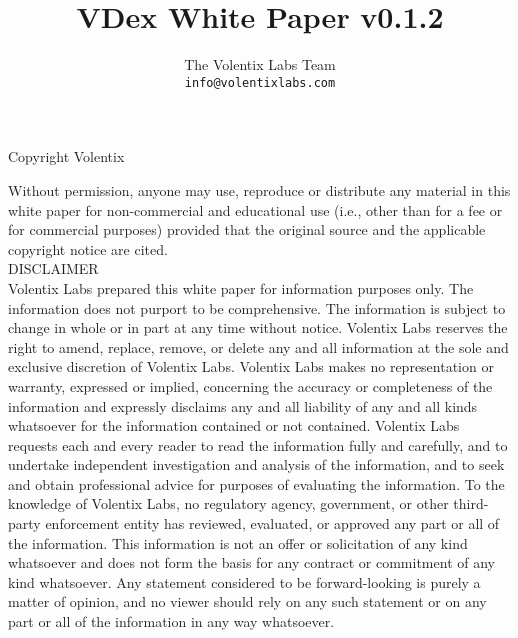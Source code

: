 \documentclass[]{article}
\title{VDex White Paper v0.1.2}
\author{
		The Volentix Labs Team\\
	\texttt{info@volentixlabs.com}
}
\begin{document}
\tableofcontents
\maketitle
\begin{description}
\item Copyright  Volentix
\end{description}

{\tiny Without permission, anyone may use, reproduce or distribute any material in this white paper for non-commercial and educational use (i.e., other than for a fee or for commercial purposes) provided that the original source and the applicable copyright notice are cited.\\

DISCLAIMER \\

Volentix Labs prepared this white paper for information purposes only. The information does not purport to be comprehensive. The information is subject to change in whole or in part at any time without notice. Volentix Labs reserves the right to amend, replace, remove, or delete any and all information at the sole and exclusive discretion of Volentix Labs. Volentix Labs makes no representation or warranty, expressed or implied, concerning the accuracy or completeness of the information and expressly disclaims any and all liability of any and all kinds whatsoever for the information contained or not contained. Volentix Labs requests each and every reader to read the information fully and carefully, and to undertake independent investigation and analysis of the information, and to seek and obtain professional advice for purposes of evaluating the information. To the knowledge of Volentix Labs, no regulatory agency, government, or other third-party enforcement entity has reviewed, evaluated, or approved any part or all of the information. This information is not an offer or solicitation of any kind whatsoever and does not form the basis for any contract or commitment of any kind whatsoever. Any statement considered to be forward-looking is purely a matter of opinion, and no viewer should rely on any such statement or on any part or all of the information in any way whatsoever.

}
\end{document}
